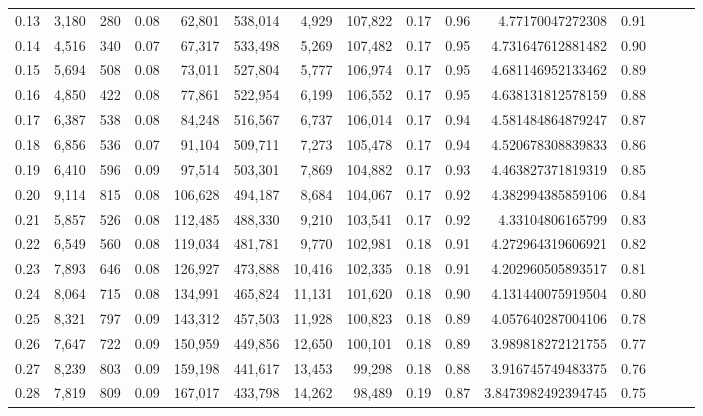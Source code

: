 \begin{tabular}{rrrrrrrrrrrrrrr}
0.13 &   3,180 &    280 &  0.08 &   62,801 &  538,014 &    4,929 &  107,822 &  0.17 &  0.96 &      4.77170047272308 &      0.91 \\
0.14 &   4,516 &    340 &  0.07 &   67,317 &  533,498 &    5,269 &  107,482 &  0.17 &  0.95 &     4.731647612881482 &      0.90 \\
0.15 &   5,694 &    508 &  0.08 &   73,011 &  527,804 &    5,777 &  106,974 &  0.17 &  0.95 &     4.681146952133462 &      0.89 \\
0.16 &   4,850 &    422 &  0.08 &   77,861 &  522,954 &    6,199 &  106,552 &  0.17 &  0.95 &     4.638131812578159 &      0.88 \\
0.17 &   6,387 &    538 &  0.08 &   84,248 &  516,567 &    6,737 &  106,014 &  0.17 &  0.94 &     4.581484864879247 &      0.87 \\
0.18 &   6,856 &    536 &  0.07 &   91,104 &  509,711 &    7,273 &  105,478 &  0.17 &  0.94 &     4.520678308839833 &      0.86 \\
0.19 &   6,410 &    596 &  0.09 &   97,514 &  503,301 &    7,869 &  104,882 &  0.17 &  0.93 &     4.463827371819319 &      0.85 \\
0.20 &   9,114 &    815 &  0.08 &  106,628 &  494,187 &    8,684 &  104,067 &  0.17 &  0.92 &     4.382994385859106 &      0.84 \\
0.21 &   5,857 &    526 &  0.08 &  112,485 &  488,330 &    9,210 &  103,541 &  0.17 &  0.92 &      4.33104806165799 &      0.83 \\
0.22 &   6,549 &    560 &  0.08 &  119,034 &  481,781 &    9,770 &  102,981 &  0.18 &  0.91 &     4.272964319606921 &      0.82 \\
0.23 &   7,893 &    646 &  0.08 &  126,927 &  473,888 &   10,416 &  102,335 &  0.18 &  0.91 &     4.202960505893517 &      0.81 \\
0.24 &   8,064 &    715 &  0.08 &  134,991 &  465,824 &   11,131 &  101,620 &  0.18 &  0.90 &     4.131440075919504 &      0.80 \\
0.25 &   8,321 &    797 &  0.09 &  143,312 &  457,503 &   11,928 &  100,823 &  0.18 &  0.89 &     4.057640287004106 &      0.78 \\
0.26 &   7,647 &    722 &  0.09 &  150,959 &  449,856 &   12,650 &  100,101 &  0.18 &  0.89 &     3.989818272121755 &      0.77 \\
0.27 &   8,239 &    803 &  0.09 &  159,198 &  441,617 &   13,453 &   99,298 &  0.18 &  0.88 &     3.916745749483375 &      0.76 \\
0.28 &   7,819 &    809 &  0.09 &  167,017 &  433,798 &   14,262 &   98,489 &  0.19 &  0.87 &    3.8473982492394745 &      0.75 \\

\end{tabular}
